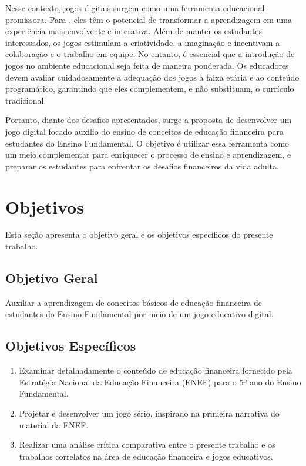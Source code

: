 Nesse contexto, jogos digitais surgem como uma ferramenta educacional promissora. Para \cite{Cruz_Araujo_Andrye_Galvao_Madeira_2022}, eles têm o potencial de transformar a aprendizagem em uma experiência mais envolvente e interativa. Além de manter os estudantes interessados, os jogos estimulam a criatividade, a imaginação e incentivam a colaboração e o trabalho em equipe. No entanto, é essencial que a introdução de jogos no ambiente educacional seja feita de maneira ponderada. Os educadores devem avaliar cuidadosamente a adequação dos jogos à faixa etária e ao conteúdo programático, garantindo que eles complementem, e não substituam, o currículo tradicional.

Portanto, diante dos desafios apresentados, surge a proposta de desenvolver um jogo digital focado auxílio do ensino de conceitos de educação financeira para estudantes do Ensino Fundamental. O objetivo é utilizar essa ferramenta como um meio complementar para enriquecer o processo de ensino e aprendizagem, e preparar os estudantes para enfrentar os desafios financeiros da vida adulta.

\section{Objetivos}
Esta seção apresenta o objetivo geral e os objetivos específicos do presente trabalho.

\subsection{Objetivo Geral}
Auxiliar a aprendizagem de conceitos básicos de educação financeira de estudantes do Ensino Fundamental por meio de um jogo educativo digital.

\subsection{Objetivos Específicos}
\begin{enumerate}[noitemsep,nosep,labelindent=\parindent,leftmargin=*,label={\alph*}) ]
	\item Examinar detalhadamente o conteúdo de educação financeira fornecido pela Estratégia Nacional da Educação Financeira (ENEF) para o 5º ano do Ensino Fundamental.
	\item Projetar e desenvolver um jogo sério, inspirado na primeira narrativa do material da ENEF.
	\item Realizar uma análise crítica comparativa entre o presente trabalho e os trabalhos correlatos na área de educação financeira e jogos educativos.
\end{enumerate}

